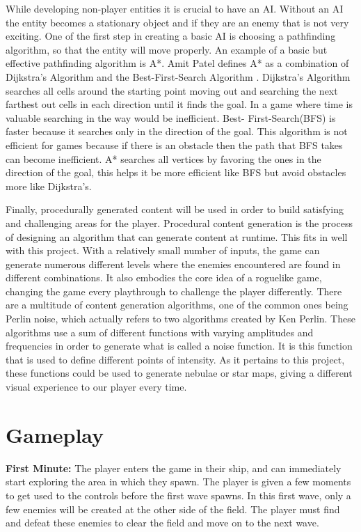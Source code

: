 \documentclass[12pt]{article}       %
\begin{document}
	While developing non-player entities it is crucial to have an AI. Without an AI the entity becomes a stationary object and if they are an enemy that is not very exciting. One of the first step in creating a basic AI is choosing a pathfinding algorithm, so that the entity will move properly. An example of a basic but effective pathfinding algorithm is A*. Amit Patel defines A* as a combination of Dijkstra’s Algorithm and the Best-First-Search Algorithm \cite{A}. Dijkstra’s Algorithm searches all cells around the starting point moving out and searching the next farthest out cells in each direction until it finds the goal. In a game where time is valuable searching in the way would be inefficient. Best- First-Search(BFS) is faster because it searches only in the direction of the goal. This algorithm is not efficient for games because if there is an obstacle then the path that BFS takes can become inefficient. A* searches all vertices by favoring the ones in the direction of the goal, this helps it be more efficient like BFS but avoid obstacles more like Dijkstra’s. \cite{A}

	Finally, procedurally generated content will be used in order to build satisfying and challenging areas for the player. Procedural content generation is the process of designing an algorithm that can generate content at runtime. This fits in well with this project. With a relatively small number of inputs, the game can generate numerous different levels where the enemies encountered are found in different combinations. It also embodies the core idea of a roguelike game, changing the game every playthrough to challenge the player differently. There are a multitude of content generation algorithms, one of the common ones being Perlin noise, which actually refers to two algorithms created by Ken Perlin. These algorithms use a sum of different functions with varying amplitudes and frequencies in order to generate what is called a noise function. It is this function that is used to define different points of intensity. As it pertains to this project, these functions could be used to generate nebulae or star maps, giving a different visual experience to our player every time. \cite{PCG}


\section{Gameplay} %
\label{sec:Gameplay}

{\bf First Minute: } The player enters the game in their ship, and can immediately start exploring the area in which they spawn. The player is given a few moments to get used to the controls before the first wave spawns. In this first wave, only a few enemies will be created at the other side of the field. The player must find and defeat these enemies to clear the field and move on to the next wave. 
\end{document}
